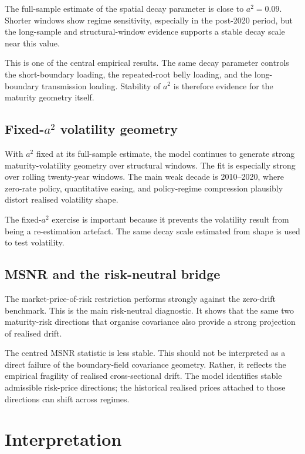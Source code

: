 \documentclass[11pt,oneside]{book}
\begin{document}
The full-sample estimate of the spatial decay parameter is close to \(a^2=0.09\). Shorter windows show regime sensitivity, especially in the post-2020 period, but the long-sample and structural-window evidence supports a stable decay scale near this value.

This is one of the central empirical results. The same decay parameter controls the short-boundary loading, the repeated-root belly loading, and the long-boundary transmission loading. Stability of \(a^2\) is therefore evidence for the maturity geometry itself.

\subsection{Fixed-\(a^2\) volatility geometry}

With \(a^2\) fixed at its full-sample estimate, the model continues to generate strong maturity-volatility geometry over structural windows. The fit is especially strong over rolling twenty-year windows. The main weak decade is 2010--2020, where zero-rate policy, quantitative easing, and policy-regime compression plausibly distort realised volatility shape.

The fixed-\(a^2\) exercise is important because it prevents the volatility result from being a re-estimation artefact. The same decay scale estimated from shape is used to test volatility.

\subsection{MSNR and the risk-neutral bridge}

The market-price-of-risk restriction performs strongly against the zero-drift benchmark. This is the main risk-neutral diagnostic. It shows that the same two maturity-risk directions that organise covariance also provide a strong projection of realised drift.

The centred MSNR statistic is less stable. This should not be interpreted as a direct failure of the boundary-field covariance geometry. Rather, it reflects the empirical fragility of realised cross-sectional drift. The model identifies stable admissible risk-price directions; the historical realised prices attached to those directions can shift across regimes.

\section{Interpretation}
\end{document}
